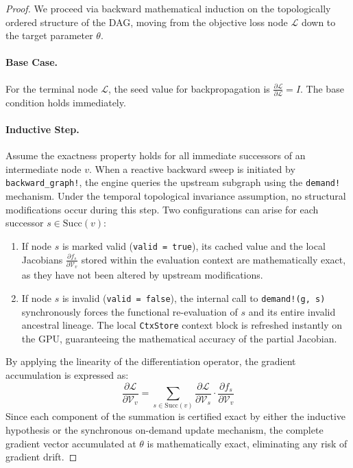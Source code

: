 \documentclass{article}
\begin{document}
\begin{proof}
We proceed via backward mathematical induction on the topologically ordered structure of the DAG, moving from the objective loss node $\mathcal{L}$ down to the target parameter $\theta$.

\paragraph{Base Case.} For the terminal node $\mathcal{L}$, the seed value for backpropagation is $\frac{\partial \mathcal{L}}{\partial \mathcal{L}} = I$. The base condition holds immediately.

\paragraph{Inductive Step.} Assume the exactness property holds for all immediate successors of an intermediate node $v$. When a reactive backward sweep is initiated by \texttt{backward\_graph!}, the engine queries the upstream subgraph using the \texttt{demand!} mechanism. Under the temporal topological invariance assumption, no structural modifications occur during this step. Two configurations can arise for each successor $s \in \text{Succ}(v)$:
\begin{enumerate}
    \item If node $s$ is marked valid (\texttt{valid = true}), its cached value and the local Jacobians $\frac{\partial f_s}{\partial \mathcal{V}_v}$ stored within the evaluation context are mathematically exact, as they have not been altered by upstream modifications.
    \item If node $s$ is invalid (\texttt{valid = false}), the internal call to \texttt{demand!(g, s)} synchronously forces the functional re-evaluation of $s$ and its entire invalid ancestral lineage. The local \texttt{CtxStore} context block is refreshed instantly on the GPU, guaranteeing the mathematical accuracy of the partial Jacobian.
\end{enumerate}

By applying the linearity of the differentiation operator, the gradient accumulation is expressed as:
\begin{equation}
\frac{\partial \mathcal{L}}{\partial \mathcal{V}_v} = \sum_{s \in \text{Succ}(v)} \frac{\partial \mathcal{L}}{\partial \mathcal{V}_s} \cdot \frac{\partial f_s}{\partial \mathcal{V}_v}
\end{equation}
Since each component of the summation is certified exact by either the inductive hypothesis or the synchronous on-demand update mechanism, the complete gradient vector accumulated at $\theta$ is mathematically exact, eliminating any risk of gradient drift.
\end{proof}
\end{document}
